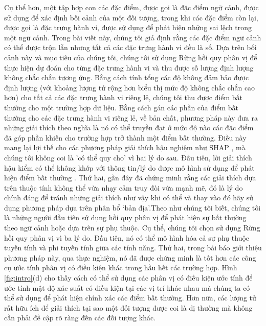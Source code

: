 Cụ thể hơn, một tập hợp con các đặc điểm, được gọi là đặc điểm ngữ cảnh, được sử dụng để xác định bối cảnh của một đối tượng, trong khi các đặc điểm còn lại, được gọi là đặc trưng hành vi, được sử dụng để phát hiện những sai lệch trong một ngữ cảnh. Trong bài viết này, chúng tôi giả định rằng các đặc điểm ngữ cảnh có thể được trộn lẫn nhưng tất cả các đặc trưng hành vi đều là số. Dựa trên bối cảnh này và mục tiêu của chúng tôi, chúng tôi sử dụng Rừng hồi quy phân vị \citep{meinshausen2006quantile} để thực hiện dự đoán cho từng đặc trưng hành vi và thu được số lượng định lượng không chắc chắn tương ứng. Bằng cách tính tổng các độ không đảm bảo được định lượng (với khoảng lượng tử rộng hơn biểu thị mức độ không chắc chắn cao hơn) cho tất cả các đặc trưng hành vi riêng lẻ, chúng tôi thu được điểm bất thường cho một trường hợp dữ liệu. Bằng cách gán các phần của điểm bất thường cho các đặc trưng hành vi riêng lẻ, về bản chất, phương pháp này đưa ra những giải thích theo nghĩa là nó có thể truyền đạt ở mức độ nào các đặc điểm đã góp phần khiến cho trường hợp trở thành một điểm bất thường. Điều này mang lại lợi thế cho các phương pháp giải thích hậu nghiệm như SHAP \citep{lundberg2017unified}, mà chúng tôi không coi là 'có thể quy cho' vì hai lý do sau. Đầu tiên, lời giải thích hậu kiểm có thể không khớp với thông tin/lý do được mô hình sử dụng để phát hiện điểm bất thường \citep{li2022survey}. Thứ hai, gần đây \citep{fokkema2022attribution} đã chứng minh rằng các giải thích dựa trên thuộc tính không thể vừa nhạy cảm truy đòi vừa mạnh mẽ, đó là lý do chính đáng để tránh những giải thích như vậy khi có thể và thay vào đó hãy sử dụng phương pháp dựa trên phân bổ `bản địa'.Theo như chúng tôi biết, chúng tôi là những người đầu tiên sử dụng hồi quy phân vị để phát hiện sự bất thường theo ngữ cảnh hoặc dựa trên sự phụ thuộc. Cụ thể, chúng tôi chọn sử dụng Rừng hồi quy phân vị vì ba lý do. Đầu tiên, nó có thể mô hình hóa cả sự phụ thuộc tuyến tính và phi tuyến tính giữa các tính năng. Thứ hai, trong bài báo giới thiệu phương pháp này, qua thực nghiệm, nó đã được chứng minh là tốt hơn các công cụ ước tính phân vị có điều kiện khác trong hầu hết các trường hợp. Hình \ref{fig:intro}(d) cho thấy cách có thể sử dụng các phân vị có điều kiện ước tính để ước tính mật độ xác suất có điều kiện tại các vị trí khác nhau mà chúng ta có thể sử dụng để phát hiện chính xác các điểm bất thường. Hơn nữa, các lượng tử rất hữu ích để giải thích tại sao một đối tượng được coi là dị thường mà không cần phải đề cập rõ ràng đến các đối tượng khác.



